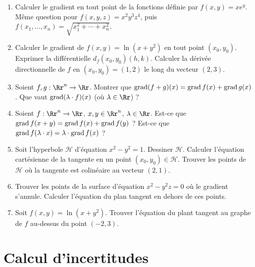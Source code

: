 \documentclass[12pt, class=report,crop=false]{standalone}
\begin{document}
\begin{miniexercices}
\sauteligne
\begin{enumerate}
  \item Calculer le gradient en tout point de la fonctions définie par $f(x,y) = xe^y$. Même question pour $f(x,y,z) = x^2y^3z^4$, puis $f(x_1,\ldots,x_n)= \sqrt{x_1^2+\cdots+x_n^2}$. 
  
  \item  Calculer le gradient de $f(x,y) = \ln(x+y^2)$ en tout point $(x_0,y_0)$.
  Exprimer la différentielle $d_f(x_0,y_0)(h,k)$. Calculer la dérivée directionnelle de $f$ en $(x_0,y_0)=(1,2)$ le long du vecteur $(2,3)$.
  
  \item Soient $f,g : \Rr^n \to \Rr$.
  Montrer que $\operatorname{grad} (f+g) (x) = \operatorname{grad} f(x) + \operatorname{grad} g(x)$. Que vaut $\operatorname{grad} (\lambda \cdot f) (x)$ (où $\lambda \in \Rr$) ?
  
  \item Soient $f : \Rr^n \to \Rr$, $x,y \in \Rr^n$, $\lambda \in \Rr$.  
  Est-ce que $\operatorname{grad} f (x+y) = \operatorname{grad} f (x) +\operatorname{grad} f (y)$ ? Est-ce que
  $\operatorname{grad} f (\lambda \cdot x) = \lambda \cdot \operatorname{grad} f (x)$ ?
     
  \item Soit l'hyperbole $\mathcal{H}$ d'équation $x^2-y^2=1$. Dessiner $\mathcal{H}$. Calculer l'équation cartésienne de la tangente en un point $(x_0,y_0) \in \mathcal{H}$. Trouver les points de $\mathcal{H}$ où la tangente est colinéaire au vecteur $(2,1)$.
   
  \item Trouver les points de la surface d'équation $x^2-y^2z=0$ où le gradient s'annule. Calculer l'équation du plan tangent en dehors de ces points.
  
  \item Soit $f(x,y) = \ln(x+y^2)$. Trouver l'équation du plant tangent au graphe de $f$ au-dessus du point $(-2,3)$.
  
   
  
\end{enumerate}
\end{miniexercices}



\section{Calcul d'incertitudes}
\end{document}
